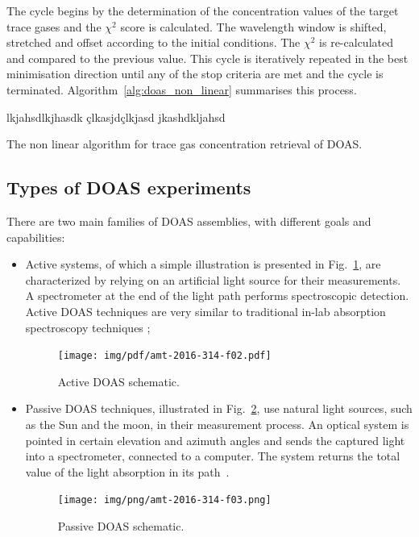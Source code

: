 The cycle begins by the determination of the concentration values of the
target trace gases and the $\chi^2$ score is calculated. The wavelength
window is shifted, stretched and offset according to the initial
conditions. The $\chi^2$ is re-calculated and compared to the previous
value. This cycle is iteratively repeated in the best minimisation
direction until any of the stop criteria are met and the cycle is
terminated. Algorithm~\ref{alg:doas_non_linear} summarises this process.


\begin{algorithm}[htb]
\SetAlgoLined
{}
lkjahsdlkjhasdk
çlkasjdçlkjasd
jkashdkljahsd
\caption{The non linear algorithm for trace gas concentration retrieval
of \gls{DOAS}.}
\label{alg:doas_non_linear}
\end{algorithm}

\subsection{ Types of \gls{DOAS} experiments}%
\label{sub:doas_categories}

There are two main families of \gls{DOAS} assemblies, with different
goals and capabilities:

\begin{itemize}

        \item Active systems, of which a simple illustration is
            presented in Fig.~\ref{fig:activeSmall}, are characterized
            by relying on an artificial light source for their
            measurements. A spectrometer at the end of the light path
            performs spectroscopic detection. Active DOAS techniques are
            very similar to traditional in-lab absorption spectroscopy
            techniques \cite{Platt2007};

            \begin{figure}[htb]
                \centering
                \texttt{[image: img/pdf/amt-2016-314-f02.pdf]}
                \caption{Active DOAS schematic.}\label{fig:activeSmall}
              \end{figure}

        \item Passive DOAS techniques, illustrated in
            Fig.~\ref{fig:passiveSchematic}, use natural light sources,
            such as the Sun and the moon, in their measurement process.
            An optical system is pointed in certain elevation and
            azimuth angles and sends the captured light into a
            spectrometer, connected to a computer. The system returns
            the total value of the light absorption in its
            path~\cite{Platt2007,Merlaud2013}.

              \begin{figure}[htb]
                  \centering
                  \texttt{[image: img/png/amt-2016-314-f03.png]}
                  \caption{Passive DOAS schematic.}\label{fig:passiveSchematic}
              \end{figure}
\end{itemize}

